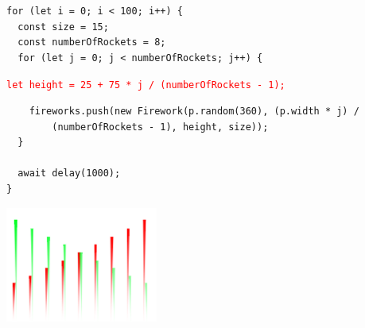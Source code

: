 \documentclass{article}
\begin{document}
    \begin{tcolorbox}[colback=gray!30, colframe=white]
        \begin{verbatim}
for (let i = 0; i < 100; i++) {
  const size = 15;
  const numberOfRockets = 8;
  for (let j = 0; j < numberOfRockets; j++) { \end{verbatim}
        \vspace{-0.4cm}
        \hspace{0.7cm}
        \texttt{\textcolor{red}{let height = 25 + 75 * j / (numberOfRockets - 1);}}\\
        \vspace{-0.4cm}
        \begin{verbatim}
    fireworks.push(new Firework(p.random(360), (p.width * j) / 
        (numberOfRockets - 1), height, size));
  }

  await delay(1000);
}\end{verbatim}
    \end{tcolorbox}


    \vspace{0.2cm}
    \centering
    \includegraphics[width=5cm]{images/Diagonale2.png}

\end{document}
